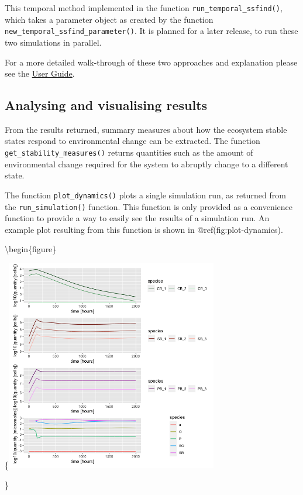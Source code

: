 \documentclass[]{elsarticle} %
\begin{document}
This temporal method implemented in the function
\texttt{run\_temporal\_ssfind()}, which takes a parameter object as
created by the function \texttt{new\_temporal\_ssfind\_parameter()}. It
is planned for a later release, to run these two simulations in
parallel.

For a more detailed walk-through of these two approaches and explanation
please see the \href{@LINK_NEEDED}{User Guide}.

\hypertarget{analysing-and-visualising-results}{%
\subsection{Analysing and visualising
results}\label{analysing-and-visualising-results}}

From the results returned, summary measures about how the ecosystem
stable states respond to environmental change can be extracted. The
function \texttt{get\_stability\_measures()} returns quantities such as
the amount of environmental change required for the system to abruptly
change to a different state.

The function \texttt{plot\_dynamics()} plots a single simulation run, as
returned from the \texttt{run\_simulation()} function. This function is
only provided as a convenience function to provide a way to easily see
the results of a simulation run. An example plot resulting from this
function is shown in @ref(fig:plot-dynamics).

\textbackslash begin\{figure\}

\{\centering \includegraphics[width=350px]{figures/ug_three_strains_dynamics}

\}
\end{document}
